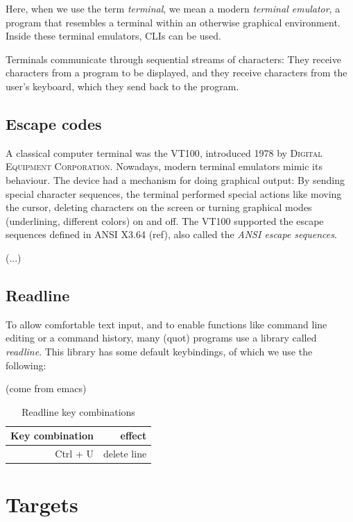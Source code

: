 \documentclass[paper=a4,twoside,abstract=on,cleardoublepage=empty,numbers=noenddot,toc=bib,12pt]{scrreprt}
\begin{document}
Here, when we use the term \emph{terminal}, we mean a modern \emph{terminal emulator}, a program that resembles a terminal within an otherwise graphical environment. Inside these terminal emulators, \textsc{CLI}s can be used.

Terminals communicate through sequential streams of characters: They receive characters from a program to be displayed, and they receive characters from the user's keyboard, which they send back to the program.

\subsection{Escape codes}

A classical computer terminal was the \textsc{VT100}, introduced 1978 by \textsc{Digital Equipment Corporation}. Nowadays, modern terminal emulators mimic its behaviour. The device had a mechanism for doing graphical output: By sending special character sequences, the terminal performed special actions like moving the cursor, deleting characters on the screen or turning graphical modes (underlining, different colors) on and off. The \textsc{VT100} supported the escape sequences defined in ANSI X3.64 (ref), also called the \emph{ANSI escape sequences}.

(...)

\subsection{Readline}

To allow comfortable text input, and to enable functions like command line editing or a command history, many (quot) programs use a library called \emph{readline}. This library has some default keybindings, of which we use the following:

(come from emacs)

\begin{table}[tb]
    \begin{tabular}{r|r}
        Key combination & effect \\
        \hline
        Ctrl + U & delete line \\
    \end{tabular}
    \caption{Readline key combinations}
\end{table}

\section{Targets}
\label{sec:targets}
\end{document}
